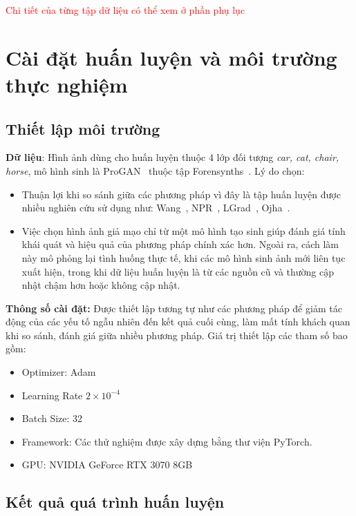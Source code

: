\textcolor{red}{Chi tiết của từng tập dữ liệu có thể xem ở phần phụ lục}

\section{Cài đặt huấn luyện và môi trường thực nghiệm}

\subsection{Thiết lập môi trường}

\textbf{Dữ liệu}: Hình ảnh dùng cho huấn luyện thuộc 4 lớp đối tượng \textit{car, cat, chair, horse}, mô hình sinh là ProGAN~\cite{karras2018progressive} thuộc tập Forensynths~\cite{Wang2019CNNGeneratedIA}. Lý do chọn:
\begin{itemize}
	\item Thuận lợi khi so sánh giữa các phương pháp vì đây là tập huấn luyện được nhiều nghiên cứu sử dụng như: Wang~\cite{Wang2019CNNGeneratedIA}, NPR~\cite{Tan2023RethinkingTU}, LGrad~\cite{Tan2023LearningOG}, Ojha~\cite{Ojha2023TowardsUF}. 
	\item Việc chọn hình ảnh giả mạo chỉ từ một mô hình tạo sinh giúp đánh giá tính khái quát và hiệu quả của phương pháp chính xác hơn. Ngoài ra, cách làm này mô phỏng lại tình huống thực tế, khi các mô hình sinh ảnh mới liên tục xuất hiện, trong khi dữ liệu huấn luyện là từ các nguồn cũ và thường cập nhật chậm hơn hoặc không cập nhật.
\end{itemize}

\textbf{Thông số cài đặt:} Được thiết lập tương tự như các phương pháp \cite{Wang2019CNNGeneratedIA, Tan2023RethinkingTU,Tan2023LearningOG} để giảm tác động của các yếu tố ngẫu nhiên đến kết quả cuối cùng, làm mất tính khách quan khi so sánh, đánh giá giữa nhiều phương pháp. Giá trị thiết lập các tham số bao gồm:
	\begin{itemize}
		\item Optimizer: Adam
		\item Learning Rate $2 \times 10^{-4}$
		\item Batch Size: 32
		\item Framework: Các thử nghiệm được xây dựng bằng thư viện PyTorch.
		\item GPU: NVIDIA GeForce RTX 3070 8GB
	\end{itemize}

\subsection{Kết quả quá trình huấn luyện}

